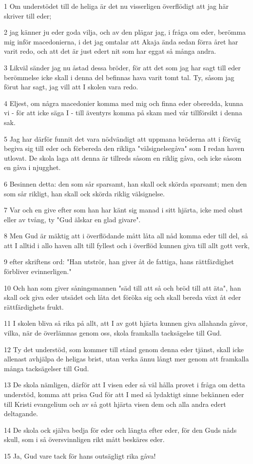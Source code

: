 \par 1 Om understödet till de heliga är det nu visserligen överflödigt att jag här skriver till eder;
\par 2 jag känner ju eder goda vilja, och av den plägar jag, i fråga om eder, berömma mig inför macedonierna, i det jag omtalar att Akaja ända sedan förra året har varit redo, och att det är just edert nit som har eggat så många andra.
\par 3 Likväl sänder jag nu åstad dessa bröder, för att det som jag har sagt till eder berömmelse icke skall i denna del befinnas hava varit tomt tal. Ty, såsom jag förut har sagt, jag vill att I skolen vara redo.
\par 4 Eljest, om några macedonier komma med mig och finna eder oberedda, kunna vi - för att icke säga I - till äventyrs komma på skam med vår tillförsikt i denna sak.
\par 5 Jag har därför funnit det vara nödvändigt att uppmana bröderna att i förväg begiva sig till eder och förbereda den rikliga "välsignelsegåva" som I redan haven utlovat. De skola laga att denna är tillreds såsom en riklig gåva, och icke såsom en gåva i njugghet.
\par 6 Besinnen detta: den som sår sparsamt, han skall ock skörda sparsamt; men den som sår rikligt, han skall ock skörda riklig välsignelse.
\par 7 Var och en give efter som han har känt sig manad i sitt hjärta, icke med olust eller av tvång, ty "Gud älskar en glad givare".
\par 8 Men Gud är mäktig att i överflödande mått låta all nåd komma eder till del, så att I alltid i allo haven allt till fyllest och i överflöd kunnen giva till allt gott verk,
\par 9 efter skriftens ord: "Han utströr, han giver åt de fattiga, hans rättfärdighet förbliver evinnerligen."
\par 10 Och han som giver såningsmannen "säd till att så och bröd till att äta", han skall ock giva eder utsädet och låta det föröka sig och skall bereda växt åt eder rättfärdighets frukt.
\par 11 I skolen bliva så rika på allt, att I av gott hjärta kunnen giva allahanda gåvor, vilka, när de överlämnas genom oss, skola framkalla tacksägelse till Gud.
\par 12 Ty det understöd, som kommer till stånd genom denna eder tjänst, skall icke allenast avhjälpa de heligas brist, utan verka ännu långt mer genom att framkalla många tacksägelser till Gud.
\par 13 De skola nämligen, därför att I visen eder så väl hålla provet i fråga om detta understöd, komma att prisa Gud för att I med så lydaktigt sinne bekännen eder till Kristi evangelium och av så gott hjärta visen dem och alla andra edert deltagande.
\par 14 De skola ock själva bedja för eder och längta efter eder, för den Guds nåds skull, som i så översvinnligen rikt mått beskäres eder.
\par 15 Ja, Gud vare tack för hans outsägligt rika gåva!

